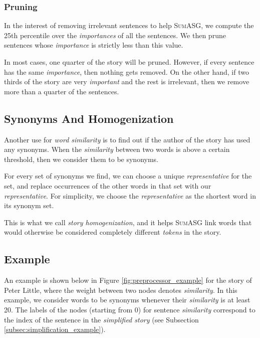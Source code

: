 \subsubsection{Pruning}

In the interest of removing irrelevant sentences to help \textsc{SumASG}, we compute the 25th percentile over the \textit{importances} of all the sentences. We then prune sentences whose \textit{importance} is strictly less than this value.

In most cases, one quarter of the story will be pruned. However, if every sentence has the same \textit{importance}, then nothing gets removed. On the other hand, if two thirds of the story are very \textit{important} and the rest is irrelevant, then we remove more than a quarter of the sentences.

\subsection{Synonyms And Homogenization}

Another use for \textit{word similarity} is to find out if the author of the story has used any synonyms. When the \textit{similarity} between two words is above a certain threshold, then we consider them to be synonyms.

For every set of synonyms we find, we can choose a unique \textit{representative} for the set, and replace occurrences of the other words in that set with our \textit{representative}. For simplicity, we choose the \textit{representative} as the shortest word in its synonym set.

This is what we call \textit{story homogenization}, and it helps \textsc{SumASG} link words that would otherwise be considered completely different \textit{tokens} in the story.

\subsection{Example}

An example is shown below in Figure \ref{fig:preprocessor_example} for the story of Peter Little, where the weight between two nodes denotes \textit{similarity}. In this example, we consider words to be synonyms whenever their \textit{similarity} is at least 20. The labels of the nodes (starting from 0) for sentence \textit{similarity} correspond to the index of the sentence in the \textit{simplified story} (see Subsection \ref{subsec:simplification_example}).


